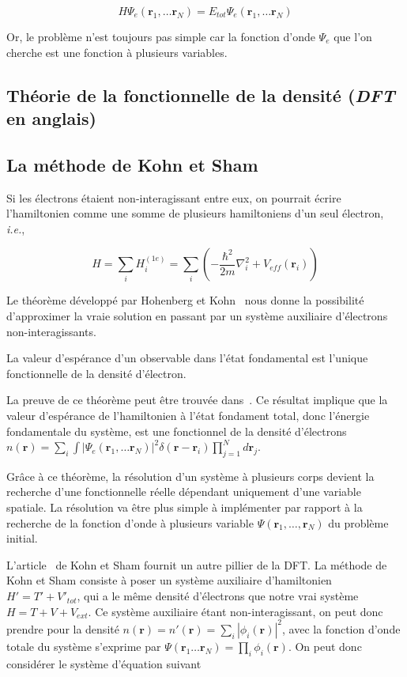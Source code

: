$$
H \Psi_e(\textbf{r}_1, \ldots \textbf{r}_N) = E_{tot} \Psi_e(\textbf{r}_1, \ldots \textbf{r}_N)
$$

Or, le problème n'est toujours pas simple car la fonction d'onde $\Psi_e$ que l'on cherche est une fonction à plusieurs variables.

\subsection{Théorie de la fonctionnelle de la densité (\textit{DFT} en anglais)}
\subsection{La méthode de Kohn et Sham}
\label{subsec-KS}
Si les électrons étaient non-interagissant entre eux, on pourrait écrire l'hamiltonien comme une somme de plusieurs hamiltoniens d'un seul électron, \textit{i.e.},

$$
H = \sum_i H_i^{(1e)} = \sum_i (-\frac{\hbar^2}{2m}\nabla_i^2 + V_{eff}(\textbf{r}_i))
$$

Le théorème développé par Hohenberg et Kohn~\cite{Hohenberg1964} nous donne la possibilité d'approximer la vraie solution en passant par un système auxiliaire d'électrons non-interagissants.

\begin{theoreme}
  La valeur d'espérance d'un observable dans l'état fondamental est l'unique fonctionnelle de la densité d'électron.
\end{theoreme}

La preuve de ce théorème peut être trouvée dans~\cite{Hohenberg1964}.
Ce résultat implique que la valeur d'espérance de l'hamiltonien à l'état fondament total, donc l'énergie fondamentale du système, est une fonctionnel de la densité d'électrons $n(\textbf{r}) = \sum_i \int |\Psi_e(\textbf{r}_1, \ldots \textbf{r}_N) |^2 \delta (\textbf{r} - \textbf{r}_i) \prod_{j=1}^N d\textbf{r}_j$.

Grâce à ce théorème, la résolution d'un système à plusieurs corps devient la recherche d'une fonctionnelle réelle dépendant uniquement d'une variable spatiale. La résolution va être plus simple à implémenter par rapport à la recherche de la fonction d'onde à plusieurs variable $\Psi (\textbf{r}_1, \ldots, \textbf{r}_N)$ du problème initial.

L'article~\cite{Kohn1965} de Kohn et Sham fournit un autre pillier de la DFT\@. La méthode de Kohn et Sham consiste à poser un système auxiliaire d'hamiltonien $H' = T' + V'_{tot}$, qui a le même densité d'électrons que notre vrai système $H = T + V + V_{ext}$. Ce système auxiliaire étant non-interagissant, on peut donc prendre pour la densité $n(\textbf{r}) = n'(\textbf{r}) = \sum_i |\phi_i(\textbf{r})|^2$, avec la fonction d'onde totale du système s'exprime par $\Psi(\textbf{r}_1 \ldots \textbf{r}_N) = \prod_i \phi_i(\textbf{r})$. On peut donc considérer le système d'équation suivant

